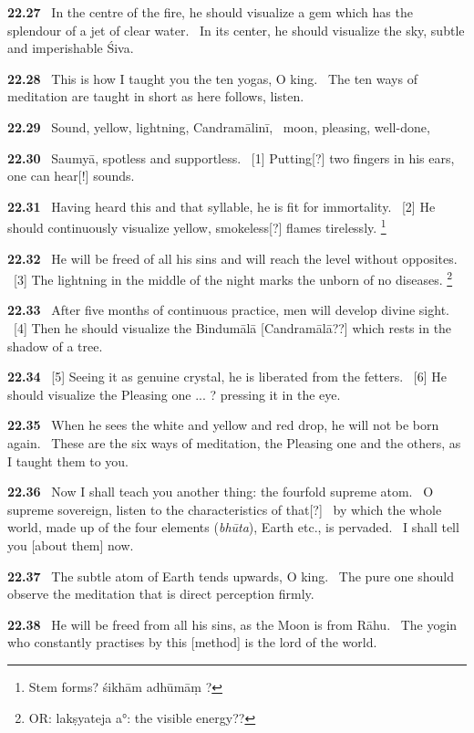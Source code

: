 \documentclass{article}
\newcommand{\skt}[1]{\textit{#1}}
\begin{document}
\textbf{22.27}%
\ In the centre of the fire, he should visualize a gem which has the splendour of a jet of clear water.%
\ In its center, he should visualize the sky, subtle and imperishable Śiva.%


\textbf{22.28}%
\ This is how I taught you the ten yogas, O king.%
\ The ten ways of meditation are taught in short as here follows, listen.%


\textbf{22.29}%
\ Sound, yellow, lightning, Candramālinī,%
\ moon, pleasing, well-done,%


\textbf{22.30}%
\ Saumyā, spotless and supportless.%
\ [1] Putting[?] two fingers in his ears, one can hear[!] sounds.%


\textbf{22.31}%
\ Having heard this and that syllable, he is fit for immortality.%
\ [2] He should continuously visualize yellow, smokeless[?] flames tirelessly.%
\footnote{Stem forms? śikhām adhūmāṃ ? }%


\textbf{22.32}%
\ He will be freed of all his sins and will reach the level without opposites.%
\ [3] The lightning in the middle of the night marks the unborn of no diseases.%
\footnote{OR: lakṣyateja a°: the visible energy?? }%


\textbf{22.33}%
\ After five months of continuous practice, men will develop divine sight.%
\ [4] Then he should visualize the Bindumālā [Candramālā??] which rests in the shadow of a tree.%


\textbf{22.34}%
\ [5] Seeing it as genuine crystal, he is liberated from the fetters.%
\ [6] He should visualize the Pleasing one ... ? pressing it in the eye.%


\textbf{22.35}%
\ When he sees the white and yellow and red drop, he will not be born again.%
\ These are the six ways of meditation, the Pleasing one and the others, as I taught them to you.%


\textbf{22.36}%
\ Now I shall teach you another thing: the fourfold supreme atom.%
\                  O supreme sovereign, listen to the characteristics of that[?]%
\                  by which the whole world, made up of the four elements (\skt{bhūta}), Earth etc., is pervaded.%
\                  I shall tell you [about them] now.%


\textbf{22.37}%
\ The subtle atom of Earth tends upwards, O king.%
\                 The pure one should observe the meditation that is direct perception firmly.%


\textbf{22.38}%
\ He will be freed from all his sins, as the Moon is from Rāhu.%
\                  The yogin who constantly practises by this [method] is the lord of the world.%
\end{document}

